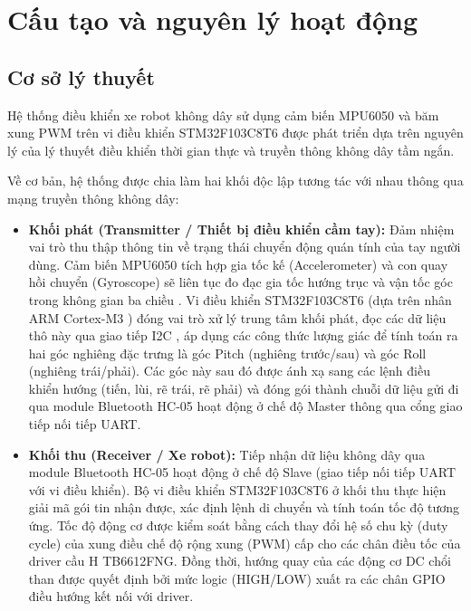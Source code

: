 \chapter{Cấu tạo và nguyên lý hoạt động}

\section{Cơ sở lý thuyết}
Hệ thống điều khiển xe robot không dây sử dụng cảm biến MPU6050 \cite{mpu6050-datasheet} và băm xung PWM trên vi điều khiển STM32F103C8T6 \cite{noviello2022mastering} được phát triển dựa trên nguyên lý của lý thuyết điều khiển thời gian thực và truyền thông không dây tầm ngắn. 

Về cơ bản, hệ thống được chia làm hai khối độc lập tương tác với nhau thông qua mạng truyền thông không dây:
\begin{itemize}
    \item \textbf{Khối phát (Transmitter / Thiết bị điều khiển cầm tay):} Đảm nhiệm vai trò thu thập thông tin về trạng thái chuyển động quán tính của tay người dùng. Cảm biến MPU6050 tích hợp gia tốc kế (Accelerometer) và con quay hồi chuyển (Gyroscope) sẽ liên tục đo đạc gia tốc hướng trục và vận tốc góc trong không gian ba chiều \cite{mpu6050-datasheet}. Vi điều khiển STM32F103C8T6 (dựa trên nhân ARM Cortex-M3 \cite{yiu2013definitive}) đóng vai trò xử lý trung tâm khối phát, đọc các dữ liệu thô này qua giao tiếp I2C \cite{stm32-hal}, áp dụng các công thức lượng giác để tính toán ra hai góc nghiêng đặc trưng là góc Pitch (nghiêng trước/sau) và góc Roll (nghiêng trái/phải). Các góc này sau đó được ánh xạ sang các lệnh điều khiển hướng (tiến, lùi, rẽ trái, rẽ phải) và đóng gói thành chuỗi dữ liệu gửi đi qua module Bluetooth HC-05 hoạt động ở chế độ Master thông qua cổng giao tiếp nối tiếp UART.
    \item \textbf{Khối thu (Receiver / Xe robot):} Tiếp nhận dữ liệu không dây qua module Bluetooth HC-05 hoạt động ở chế độ Slave (giao tiếp nối tiếp UART với vi điều khiển). Bộ vi điều khiển STM32F103C8T6 ở khối thu thực hiện giải mã gói tin nhận được, xác định lệnh di chuyển và tính toán tốc độ tương ứng. Tốc độ động cơ được kiểm soát bằng cách thay đổi hệ số chu kỳ (duty cycle) của xung điều chế độ rộng xung (PWM) cấp cho các chân điều tốc của driver cầu H TB6612FNG. Đồng thời, hướng quay của các động cơ DC chổi than được quyết định bởi mức logic (HIGH/LOW) xuất ra các chân GPIO điều hướng kết nối với driver.
\end{itemize}

